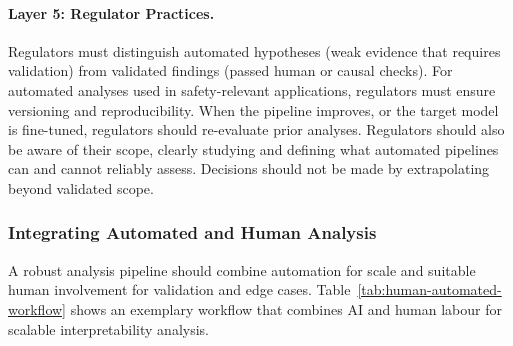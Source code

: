 \begin{practicebox}
\paragraph{Layer 5: Regulator Practices.} Regulators must distinguish automated hypotheses (weak evidence that requires validation) from validated findings (passed human or causal checks). For automated analyses used in safety-relevant applications, regulators must ensure versioning and reproducibility. When the pipeline improves, or the target model is fine-tuned, regulators should re-evaluate prior analyses. Regulators should also be aware of their scope, clearly studying and defining what automated pipelines can and cannot reliably assess. Decisions should not be made by extrapolating beyond validated scope.
\end{practicebox}








\subsubsection{Integrating Automated and Human Analysis}

A robust analysis pipeline should combine automation for scale and suitable human involvement for validation and edge cases. Table~\ref{tab:human-automated-workflow} shows an exemplary workflow that combines AI and human labour for scalable interpretability analysis.

